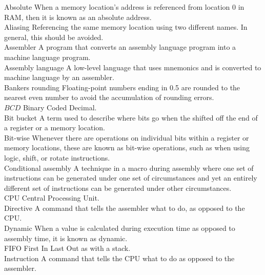\documentclass[10pt]{book}
\begin{document}
Absolute When a memory location's address is referenced from location 0 in RAM, then it is known as an absolute address.\\
Aliasing Referencing the same memory location using two different names. In general, this should be avoided.\\
Assembler A program that converts an assembly language program into a machine language program.\\
Assembly language A low-level language that uses mnemonics and is converted to machine language by an assembler.\\
Bankers rounding Floating-point numbers ending in 0.5 are rounded to the nearest even number to avoid the accumulation of rounding errors.\\
$B C D$ Binary Coded Decimal.\\
Bit bucket A term used to describe where bits go when the shifted off the end of a register or a memory location.\\
Bit-wise Whenever there are operations on individual bits within a register or memory locations, these are known as bit-wise operations, such as when using logic, shift, or rotate instructions.\\
Conditional assembly A technique in a macro during assembly where one set of instructions can be generated under one set of circumstances and yet an entirely different set of instructions can be generated under other circumstances.\\
CPU Central Processing Unit.\\
Directive A command that tells the assembler what to do, as opposed to the CPU.\\
Dynamic When a value is calculated during execution time as opposed to assembly time, it is known as dynamic.\\
FIFO First In Last Out as with a stack.\\
Instruction A command that tells the CPU what to do as opposed to the assembler.
\end{document}
